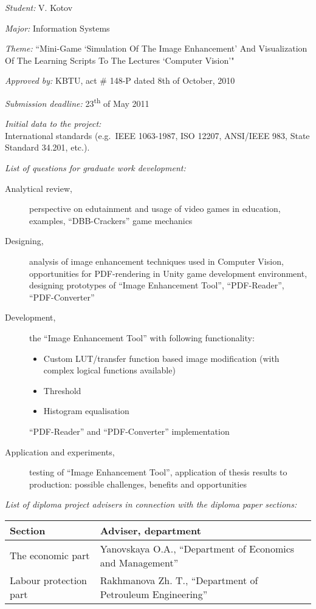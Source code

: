 \begin{titlepage}
\begin{center}
	\end{center}

	\setlength{\parindent}{0pt}
	\setlength{\parskip}{1ex plus 0.5ex minus 0.2ex}

	\emph{Student:} V. Kotov

	\emph{Major:} Information Systems

	\emph{Theme:} ``Mini-Game `Simulation Of The Image Enhancement' And Visualization Of The Learning Scripts To The Lectures `Computer Vision'"

	\emph{Approved by:} KBTU, act \# 148-P dated 8th of October, 2010

	\emph{Submission deadline:} 23\textsuperscript{th} of May 2011

	\emph{Initial data to the project:}\\
	International standards (e.g.\ IEEE 1063-1987, ISO 12207, ANSI/IEEE 983, State Standard 34.201, etc.).

	\emph{List of questions for graduate work development:}
	\begin{description}
		\item[Analytical review,]
		perspective on edutainment and usage of video games in education, examples, ``DBB-Crackers'' game mechanics
		\item[Designing,]
		analysis of image enhancement techniques used in Computer Vision, opportunities for PDF-rendering in Unity game development environment, designing prototypes of ``Image Enhancement Tool'', ``PDF-Reader'', ``PDF-Converter''
		\item[Development,]
		the ``Image Enhancement Tool'' with following functionality:
		\begin{itemize}
			\item Custom LUT/transfer function based image modification (with complex logical functions available)
			\item Threshold 
			\item Histogram equalisation
		\end{itemize}
		``PDF-Reader'' and ``PDF-Converter'' implementation
		\item[Application and experiments,]
		testing of ``Image Enhancement Tool'', application of thesis results to production: possible challenges, benefits and opportunities
	\end{description}

	\emph{List of diploma project advisers in connection with the diploma paper sections:}

	\begin{centering}
		\begin{tabularx}{\textwidth}{|X|X|}
			\hline
			\textbf{Section} & \textbf{Adviser, department}\\
			\hline
			The economic part & Yanovskaya O.A., ``Department of Economics and Management'' \\
			\hline
			Labour protection part & Rakhmanova Zh. T., ``Department of Petrouleum Engineering'' \\
			\hline
		\end{tabularx}
	\end{centering}


\end{titlepage}
